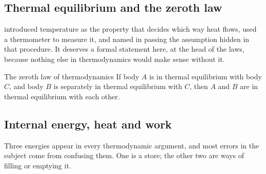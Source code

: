 \subsection{Thermal equilibrium and the zeroth law}

 introduced temperature as the property that decides which way heat flows, used a thermometer to measure it, and named in passing the assumption hidden in that procedure. It deserves a formal statement here, at the head of the laws, because nothing else in thermodynamics would make sense without it.

\begin{defbox}{The zeroth law of thermodynamics}
If body $A$ is in thermal equilibrium with body $C$, and body $B$ is separately in thermal equilibrium
with $C$, then $A$ and $B$ are in thermal equilibrium with each other.
\end{defbox}


\subsection{Internal energy, heat and work}

Three energies appear in every thermodynamic argument, and most errors in the subject come from
confusing them. One is a store; the other two are ways of filling or emptying it.

